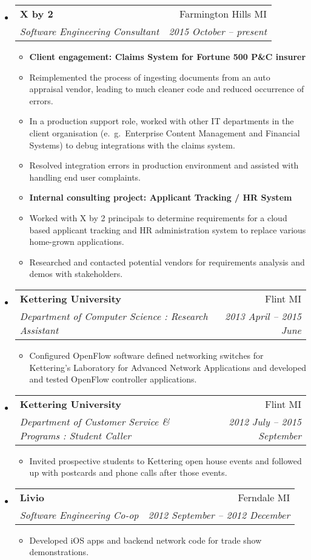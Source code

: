 \documentclass[letterpaper,10pt]{article}
\makeatletter
\newcommand{\resitem}[1]{\item #1 \vspace{-2pt}}
\newcommand{\ressubheading}[4]{
\begin{tabular*}{6.5in}{l@{\cftdotfill{\cftsecdotsep}\extracolsep{\fill}}r}
        \textbf{#1} & #2 \\
        \textit{#3} & \textit{#4} \\
\end{tabular*}\vspace{-6pt}}
\makeatother
\begin{document}
\begin{itemize}

\item
\ressubheading{X by 2}{Farmington Hills MI}{Software Engineering Consultant}{2015 October -- present}
\begin{itemize}\small
    \resitem{{\bf Client engagement: Claims System for Fortune 500 P\&C insurer}}
    \resitem{Reimplemented the process of ingesting documents from an auto appraisal vendor,
             leading to much cleaner code and reduced occurrence of errors.}
    \resitem{In a production support role, worked with other IT departments in the client organisation (e.\ g.\ Enterprise Content Management 
             and Financial Systems) to debug integrations with the claims system.}
    \resitem{Resolved integration errors in production environment and assisted with handling end user complaints.}
    \resitem{{\bf Internal consulting project: Applicant Tracking / HR System}}
    \resitem{Worked with X by 2 principals to determine requirements for a cloud based applicant tracking
             and HR administration system to replace various home-grown applications.}
    \resitem{Researched and contacted potential vendors for requirements analysis and demos with stakeholders.}
\end{itemize}

\item
\ressubheading{Kettering University}{Flint MI}{Department of Computer Science : Research Assistant}{2013 April -- 2015 June}
\begin{itemize}\small
    \resitem{Configured OpenFlow software defined networking switches for Kettering's 
    	     Laboratory for Advanced Network Applications and developed and tested OpenFlow controller applications.}
\end{itemize}
    
\item
\ressubheading{Kettering University}{Flint MI}{Department of Customer Service \& Programs : Student Caller}{2012 July -- 2015 September}
\begin{itemize}\small
    \resitem{Invited prospective students to Kettering open house events and followed up with postcards 
             and phone calls after those events.}
\end{itemize}

\item
\ressubheading{Livio}{Ferndale MI}{Software Engineering Co-op}{2012 September -- 2012 December}
\begin{itemize}\small
    \resitem{Developed iOS apps and backend network code for trade show demonstrations.}
\end{itemize}


\end{itemize}
\end{document}
